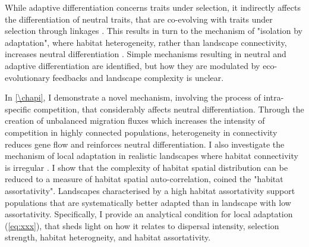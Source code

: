 % 
% 
While adaptive differentiation concerns traits under selection, it indirectly affects the differentiation of neutral traits, that are co-evolving with traits under selection through linkages \citep{Billiard2015,Lepers2021}. This results in turn to the mechanism of "isolation by adaptation", where habitat heterogeneity, rather than landscape connectivity, increases neutral differentiation \citep{nosil2008}. 
% 
Simple mechanisms resulting in neutral and adaptive differentiation are identified, but how they are modulated by eco-evolutionary feedbacks and landscape complexity is unclear. %

In \cref{\chapi}, I demonstrate a novel mechanism, involving the process of intra-specific competition, that considerably affects neutral differentiation. Through the creation of unbalanced migration fluxes which increases the intensity of competition in highly connected populations, heterogeneity in connectivity reduces gene flow and reinforces neutral differentiation. %
% 
I also investigate the mechanism of local adaptation in realistic landscapes where habitat connectivity is irregular \citep{Dale2010,LiebermanHauert2005}. I show that the complexity of habitat spatial distribution can be reduced to a measure of habitat spatial auto-correlation, coined the "habitat assortativity". Landscapes characterised by a high habitat assortativity support populations that are systematically better adapted than in landscape with low assortativity. Specifically, I provide an analytical condition for local adaptation  (\cref{eq:xxx}), that sheds light on how it relates to dispersal intensity, selection strength, habitat heterogneity, and habitat assortativity.

